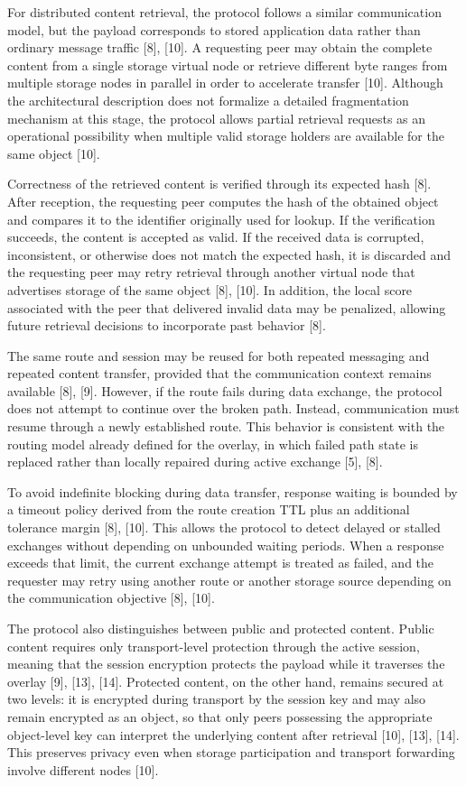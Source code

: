 \documentclass[12pt,a4paper]{article}
\begin{document}
For distributed content retrieval, the protocol follows a similar communication model, but the payload corresponds to stored application data rather than ordinary message traffic [8], [10]. A requesting peer may obtain the complete content from a single storage virtual node or retrieve different byte ranges from multiple storage nodes in parallel in order to accelerate transfer [10]. Although the architectural description does not formalize a detailed fragmentation mechanism at this stage, the protocol allows partial retrieval requests as an operational possibility when multiple valid storage holders are available for the same object [10].

Correctness of the retrieved content is verified through its expected hash [8]. After reception, the requesting peer computes the hash of the obtained object and compares it to the identifier originally used for lookup. If the verification succeeds, the content is accepted as valid. If the received data is corrupted, inconsistent, or otherwise does not match the expected hash, it is discarded and the requesting peer may retry retrieval through another virtual node that advertises storage of the same object [8], [10]. In addition, the local score associated with the peer that delivered invalid data may be penalized, allowing future retrieval decisions to incorporate past behavior [8].

The same route and session may be reused for both repeated messaging and repeated content transfer, provided that the communication context remains available [8], [9]. However, if the route fails during data exchange, the protocol does not attempt to continue over the broken path. Instead, communication must resume through a newly established route. This behavior is consistent with the routing model already defined for the overlay, in which failed path state is replaced rather than locally repaired during active exchange [5], [8].

To avoid indefinite blocking during data transfer, response waiting is bounded by a timeout policy derived from the route creation TTL plus an additional tolerance margin [8], [10]. This allows the protocol to detect delayed or stalled exchanges without depending on unbounded waiting periods. When a response exceeds that limit, the current exchange attempt is treated as failed, and the requester may retry using another route or another storage source depending on the communication objective [8], [10].

The protocol also distinguishes between public and protected content. Public content requires only transport-level protection through the active session, meaning that the session encryption protects the payload while it traverses the overlay [9], [13], [14]. Protected content, on the other hand, remains secured at two levels: it is encrypted during transport by the session key and may also remain encrypted as an object, so that only peers possessing the appropriate object-level key can interpret the underlying content after retrieval [10], [13], [14]. This preserves privacy even when storage participation and transport forwarding involve different nodes [10].
\end{document}
